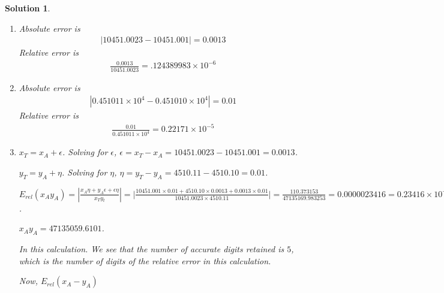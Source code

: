 \documentclass[12pt, letterpaper]{article}
\theoremstyle{nonumberplain}
\newtheorem{sol}{Solution}
\begin{document}
\hspace{18pt}
\begin{sol}
	\begin{enumerate}[label=\alph*)]
		\item Absolute error is
		      \begin{gather*}
			      |10451.0023 - 10451.001| = 0.0013
		      \end{gather*}
		      Relative error is
		      \begin{gather*}
			      \frac{0.0013}{10451.0023} = .124389983 \times 10^{-6}
		      \end{gather*}
		\item Absolute error is
		      \begin{gather*}
			      |0.451011 \times 10^4 - 0.451010\times 10^4| = 0.01
		      \end{gather*}
		      Relative error is
		      \begin{gather*}
			      \frac{0.01}{0.451011\times 10^4} = 0.22171 \times 10^{-5}
		      \end{gather*}
		\item $x_T = x_A + \epsilon$. Solving for $\epsilon$, $\epsilon = x_T - x_A = 10451.0023 - 10451.001 = 0.0013$.

		      $y_T = y_A + \eta$. Solving for $\eta$, $\eta = y_T - y_A = 4510.11 - 4510.10 = 0.01$.

		      $E_{rel}(x_Ay_A) = | \frac{x_A\eta + y_A\epsilon + \epsilon \eta}{x_Ty_t} | = \Big|  \frac{10451.001 \times 0.01 + 4510.10 \times 0.0013 + 0.0013 \times 0.01}{10451.0023 \times 4510.11} | = \frac{110.373153}{47135169.983253} = 0.0000023416 = 0.23416\times 10^{-5}$.

		      $x_Ay_A = 47135059.6101$.

		      In this calculation. We see that the number of accurate digits retained is $5$, which is the number of digits of the relative error in this calculation.

		      Now, $E_{rel}(x_A - y_A)$
	\end{enumerate}
\end{sol}
\end{document}

